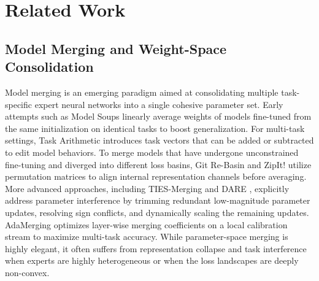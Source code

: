 \section{Related Work}
\label{sec:related_work}

\subsection{Model Merging and Weight-Space Consolidation}
Model merging is an emerging paradigm aimed at consolidating multiple task-specific expert neural networks into a single cohesive parameter set. Early attempts such as Model Soups \cite{wortsman2022model} linearly average weights of models fine-tuned from the same initialization on identical tasks to boost generalization. For multi-task settings, Task Arithmetic \cite{ilharco2022editing} introduces task vectors that can be added or subtracted to edit model behaviors. To merge models that have undergone unconstrained fine-tuning and diverged into different loss basins, Git Re-Basin \cite{ainsworth2022git} and ZipIt! \cite{stoica2023zipit} utilize permutation matrices to align internal representation channels before averaging. More advanced approaches, including TIES-Merging \cite{yadav2023ties} and DARE \cite{yu2024dare}, explicitly address parameter interference by trimming redundant low-magnitude parameter updates, resolving sign conflicts, and dynamically scaling the remaining updates. AdaMerging \cite{yang2023adamerging} optimizes layer-wise merging coefficients on a local calibration stream to maximize multi-task accuracy. While parameter-space merging is highly elegant, it often suffers from representation collapse and task interference when experts are highly heterogeneous or when the loss landscapes are deeply non-convex.

